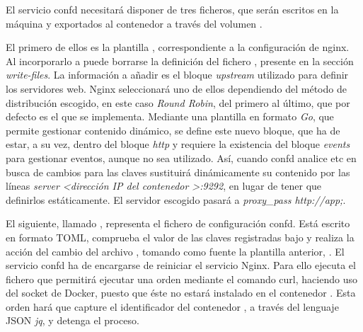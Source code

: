 El servicio confd necesitará disponer de tres ficheros, que serán escritos en la máquina y exportados al contenedor a través del volumen .

El primero de ellos es la plantilla , correspondiente a la configuración de nginx. Al incorporarlo a  puede borrarse la definición del fichero , presente en la sección \textit{write-files}. La información a añadir es el bloque \textit{upstream} utilizado para definir los servidores web. Nginx seleccionará uno de ellos dependiendo del método de distribución escogido, en este caso \textit{Round Robin}, del primero al último, que por defecto es el que se implementa. Mediante una plantilla en formato \textit{Go}, que permite gestionar contenido dinámico, se define este nuevo bloque, que ha de estar, a su vez, dentro del bloque \textit{http} y requiere la existencia del bloque \textit{events} para gestionar eventos, aunque no sea utilizado. Así, cuando confd analice etc en busca de cambios para las claves  sustituirá dinámicamente su contenido por las líneas \textit{server <dirección IP del contenedor >:9292}, en lugar de tener que definirlos estáticamente. El servidor escogido pasará a \textit{proxy\_pass http://app;}.

\begin{codelisting}
\label{code:nginx.conf.tmpl}
\end{codelisting}

El siguiente, llamado , representa el fichero de configuración confd. Está escrito en formato TOML, comprueba el valor de las claves registradas bajo  y realiza la acción del cambio del archivo , tomando como fuente la plantilla anterior, . El servicio confd ha de encargarse de reiniciar el servicio Nginx. Para ello ejecuta el fichero  que permitirá ejecutar una orden mediante el comando curl, haciendo uso del socket de Docker, puesto que éste no estará instalado en el contenedor . Esta orden hará que capture el identificador del contenedor , a través del lenguaje JSON \textit{jq}, y detenga el proceso. 


